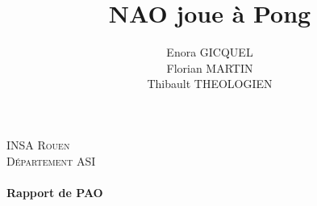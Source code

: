 \documentclass[a4paper,12pt]{article}
\title{NAO joue à Pong}
\author{
	Enora GICQUEL\\
	Florian MARTIN\\
	Thibault THEOLOGIEN
}
\begin{document}
	\makeatletter
	\begin{titlepage}
		\begin{center}
			\centering

      {\large \textsc{INSA Rouen}}\\
      \textsc{Département ASI}\\

			\vspace{2em}
      {\large \textbf{\@date\\
       								Rapport de PAO}}\\
	    \vspace{6em}
	     {\LARGE \textbf{\@title}} \\
	    \vfill
	      {\large \@author} \\
		\end{center}
	\end{titlepage}
	\makeatother

	\pagebreak
	\tableofcontents
	\pagebreak

	
	
	
	
	
	
	
	
	
	
\end{document}
